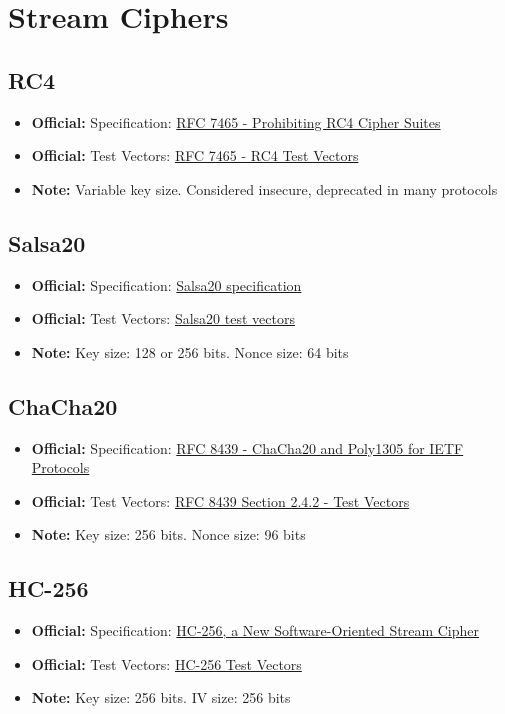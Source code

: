 \documentclass[12pt,a4paper]{article}
\newcommand{\official}[1]{\textcolor{citegreen}{\textbf{Official:}} #1}
\newcommand{\note}[1]{\textcolor{noteorange}{\textbf{Note:}} #1}
\newcommand{\link}[2]{\href{#1}{#2}}
\begin{document}
\newpage

\section{Stream Ciphers}

\subsection{RC4}
\begin{itemize}
    \item \official{Specification:} \link{https://tools.ietf.org/html/rfc7465}{RFC 7465 - Prohibiting RC4 Cipher Suites}
    \item \official{Test Vectors:} \link{https://tools.ietf.org/html/rfc7465}{RFC 7465 - RC4 Test Vectors}
    \item \note{Variable key size. Considered insecure, deprecated in many protocols}
\end{itemize}

\subsection{Salsa20}
\begin{itemize}
    \item \official{Specification:} \link{https://cr.yp.to/snuffle/spec.pdf}{Salsa20 specification}
    \item \official{Test Vectors:} \link{https://cr.yp.to/snuffle/vectors.pdf}{Salsa20 test vectors}
    \item \note{Key size: 128 or 256 bits. Nonce size: 64 bits}
\end{itemize}

\subsection{ChaCha20}
\begin{itemize}
    \item \official{Specification:} \link{https://tools.ietf.org/html/rfc8439}{RFC 8439 - ChaCha20 and Poly1305 for IETF Protocols}
    \item \official{Test Vectors:} \link{https://tools.ietf.org/html/rfc8439#section-2.4.2}{RFC 8439 Section 2.4.2 - Test Vectors}
    \item \note{Key size: 256 bits. Nonce size: 96 bits}
\end{itemize}

\subsection{HC-256}
\begin{itemize}
    \item \official{Specification:} \link{https://eprint.iacr.org/2004/092.pdf}{HC-256, a New Software-Oriented Stream Cipher}
    \item \official{Test Vectors:} \link{https://eprint.iacr.org/2004/092.pdf}{HC-256 Test Vectors}
    \item \note{Key size: 256 bits. IV size: 256 bits}
\end{itemize}
\end{document}
